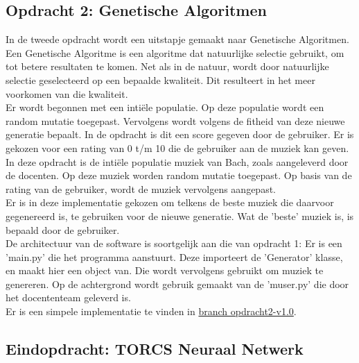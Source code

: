 \documentclass{article} %
\begin{document}
        \newpage

        \subsection{Opdracht 2: Genetische Algoritmen}
        
            In de tweede opdracht wordt een uitstapje gemaakt naar Genetische Algoritmen. Een Genetische Algoritme is een algoritme dat natuurlijke selectie gebruikt, om tot betere resultaten te komen. Net als in de natuur, wordt door natuurlijke selectie geselecteerd op een bepaalde kwaliteit. Dit resulteert in het meer voorkomen van die kwaliteit. \\
            Er wordt begonnen met een intiële populatie. Op deze populatie wordt een random mutatie toegepast. Vervolgens wordt volgens de fitheid van deze nieuwe generatie bepaalt. In de opdracht is dit een score gegeven door de gebruiker. Er is gekozen voor een rating van 0 t/m 10 die de gebruiker aan de muziek kan geven. \\
            In deze opdracht is de intiële populatie muziek van Bach, zoals aangeleverd door de docenten. Op deze muziek worden random mutatie toegepast. Op basis van de rating van de gebruiker, wordt de muziek vervolgens aangepast. \\
            Er is in deze implementatie gekozen om telkens de beste muziek die daarvoor gegenereerd is, te gebruiken voor de nieuwe generatie. Wat de 'beste' muziek is, is bepaald door de gebruiker. \\
            De architectuur van de software is soortgelijk aan die van opdracht 1: Er is een 'main.py' die het programma aanstuurt. Deze importeert de 'Generator' klasse, en maakt hier een object van. Die wordt vervolgens gebruikt om muziek te genereren. Op de achtergrond wordt gebruik gemaakt van de 'muser.py' die door het docententeam geleverd is. \\
            Er is een simpele implementatie te vinden in  \href{https://github.com/tdregmans/TINLML02-persoonlijk-verslag/tree/opdracht2-v1.0/opdracht2}{branch opdracht2-v1.0}.
    
        \newpage

        \subsection{Eindopdracht: TORCS Neuraal Netwerk}
        
\end{document}
